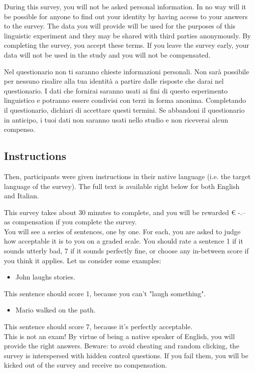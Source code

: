 \begin{kaobox}[frametitle=Privacy policy for the English survey]
During this survey, you will not be asked personal information. In no way will it be possible for anyone to find out your identity by having access to your answers to the survey. The data you will provide will be used for the purposes of this linguistic experiment and they may be shared with third parties anonymously. By completing the survey, you accept these terms. If you leave the survey early, your data will not be used in the study and you will not be compensated.
\end{kaobox}

\begin{kaobox}[frametitle=Privacy policy for the Italian survey]
Nel questionario non ti saranno chieste informazioni personali. Non sarà possibile per nessuno risalire alla tua identità a partire dalle risposte che darai nel questionario. I dati che fornirai saranno usati ai fini di questo esperimento linguistico e potranno essere condivisi con terzi in forma anonima. Completando il questionario, dichiari di accettare questi termini. Se abbandoni il questionario in anticipo, i tuoi dati non saranno usati nello studio e non riceverai alcun compenso.
\end{kaobox}

\subsection{Instructions} 
Then, participants were given instructions in their native language (i.e. the target language of the survey). The full text is available right below for both English and Italian.

\begin{kaobox}[frametitle=Instructions for the English survey]
This survey takes about 30 minutes to complete, and you will be rewarded € -.-- as compensation if you complete the survey.\\
You will see a series of sentences, one by one. For each, you are asked to judge how acceptable it is to you on a graded scale. You should rate a sentence 1 if it sounds utterly bad, 7 if it sounds perfectly fine, or choose any in-between score if you think it applies. Let us consider some examples:
\begin{itemize}
    \item John laughs stories.
\end{itemize}
This sentence should score 1, because you can't "laugh something".
\begin{itemize}
    \item Mario walked on the path.
\end{itemize}
This sentence should score 7, because it's perfectly acceptable.\\
This is not an exam! By virtue of being a native speaker of English, you will provide the right answers. Beware: to avoid cheating and random clicking, the survey is interspersed with hidden control questions. If you fail them, you will be kicked out of the survey and receive no compensation.
\end{kaobox}

